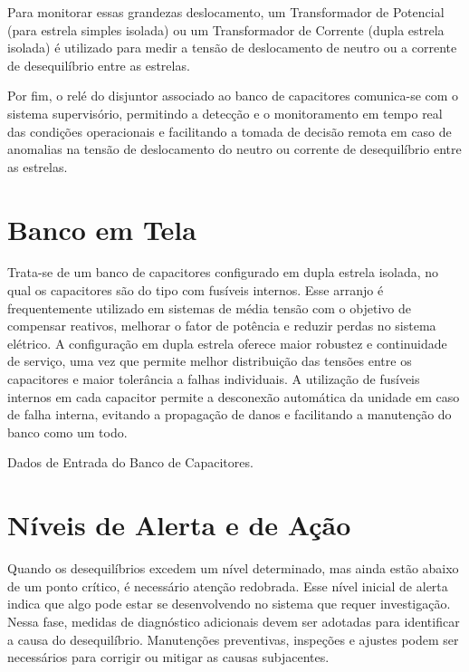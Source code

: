 \documentclass[a4paper]{article}
\begin{document}
Para monitorar essas grandezas deslocamento, um Transformador de Potencial (para estrela simples isolada) ou um Transformador de Corrente (dupla estrela isolada) é utilizado para medir a tensão de deslocamento de neutro ou a corrente de desequilíbrio entre as estrelas.  

Por fim, o relé do disjuntor associado ao banco de capacitores comunica-se com o sistema supervisório, permitindo a detecção e o monitoramento em tempo real das condições operacionais e facilitando a tomada de decisão remota em caso de anomalias na tensão de deslocamento do neutro ou corrente de desequilíbrio entre as estrelas.



\section{Banco em Tela}

Trata-se de um banco de capacitores configurado em dupla estrela isolada, no qual os capacitores são do tipo com fusíveis internos. Esse arranjo é frequentemente utilizado em sistemas de média tensão com o objetivo de compensar reativos, melhorar o fator de potência e reduzir perdas no sistema elétrico. A configuração em dupla estrela oferece maior robustez e continuidade de serviço, uma vez que permite melhor distribuição das tensões entre os capacitores e maior tolerância a falhas individuais. A utilização de fusíveis internos em cada capacitor permite a desconexão automática da unidade em caso de falha interna, evitando a propagação de danos e facilitando a manutenção do banco como um todo.

\begin{table}[htbp]
	\centering
	\renewcommand{\arraystretch}{1.25}
	\caption[]{Dados de Entrada do Banco de Capacitores.}
	
	\label{tab:tabela_parametros_tabular_fusiveis_internos}
\end{table}






\section{Níveis de Alerta e de Ação}
Quando os desequilíbrios excedem um nível determinado, mas ainda estão abaixo de um ponto crítico, é necessário atenção redobrada. Esse nível inicial de alerta indica que algo pode estar se desenvolvendo no sistema que requer investigação. Nessa fase, medidas de diagnóstico adicionais devem ser adotadas para identificar a causa do desequilíbrio. Manutenções preventivas, inspeções e ajustes podem ser necessários para corrigir ou mitigar as causas subjacentes.
\end{document}

